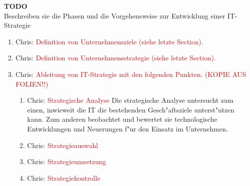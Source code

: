 \textbf{TODO}\\
Beschreiben sie die Phasen und die Vorgehensweise zur Entwicklung einer IT-Strategie

\begin{enumerate}

	\item Chris: \textcolor{red}{Definition von Unternehmensziele (siehe letzte Section).}
	
	\item Chris: \textcolor{red}{Definition von Unternehmensstrategie (siehe letzte Section).}	
	
	\item Chris: \textcolor{red}{Ableitung von IT-Strategie mit den folgenden Punkten. (KOPIE AUS FOLIEN!!)}
	
\begin{enumerate}

		\item Chris: \textcolor{red}{Strategische Analyse}
Die strategische Analyse untersucht zum einen, inwieweit die IT die bestehenden Gesch"aftsziele unterst"utzen kann. Zum anderen beobachtet und bewertet sie technologische Entwicklungen und Neuerungen f"ur den Einsatz im Unternehmen.
		
		\item Chris: \textcolor{red}{Strategieauswahl}
		
		\item Chris: \textcolor{red}{Strategieumsetzung}
		
		\item Chris: \textcolor{red}{Strategiekontrolle}

\end{enumerate}
	
\end{enumerate}
